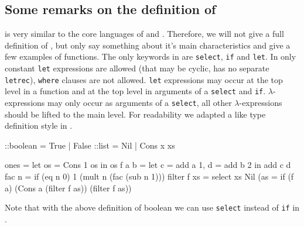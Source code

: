 \subsection{Some remarks on the definition of \Sapl}
\Sapl is very similar to the core languages of \Haskell and \Clean. 
Therefore, we will not give a full definition of \Sapl, but only say something about it's main characteristics
and give a few examples of \Sapl functions.
The only keywords in \Sapl are \texttt{select}, \texttt{if} and \texttt{let}.
In \Sapl only constant \texttt{let} expressions are allowed 
(that may be cyclic, \Sapl has no separate \texttt{letrec}), \texttt{where} clauses are not allowed.
\texttt{let} expressions may occur at the top level in a function and at the top level in  arguments of a  \texttt{select} and \texttt{if}.
$\lambda$-expressions may only occur as arguments of a \texttt{select}, all other $\lambda$-expressions should be lifted to the main
level. 
For readability we adapted a \Clean like type definition style in \Sapl. 
\begin{CleanCode}
::boolean = True | False
::list = Nil | Cons x xs

ones = let os = Cons 1 os in os 
f a b = let c = add a 1, d = add b 2 in add c d
fac n = if (eq n 0) 1 (mult n (fac (sub n 1)))
filter f xs = select xs Nil (\a as = if (f a) (Cons a (filter f as)) (filter f as))
\end{CleanCode}
Note that with the above definition of boolean we can use \texttt{select} instead of \texttt{if} in \Sapl. 





